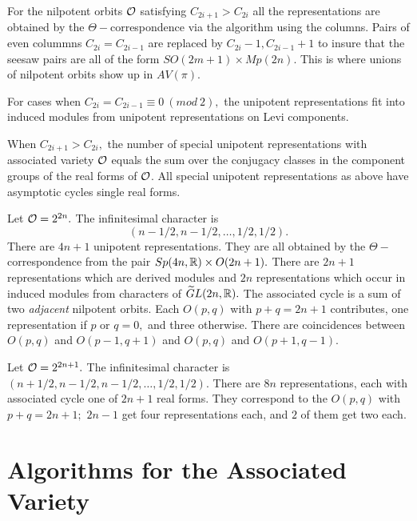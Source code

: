 \documentclass[11pt ,reqno]{amsart}
\begin{document}
\begin{theorem}\label{t:seesaw}
For the nilpotent orbits ${\mathcal O}$ satisfying $C_{2i+1}>C_{2i}$ all the
representations are obtained by the $\Theta-$correspondence via the
algorithm using the columns. Pairs of even colummns $C_{2i}=C_{2i-1}$
are replaced by  $C_{2i}-1,C_{2i-1}+1$ to insure that the seesaw pairs
are all of the form $SO(2m+1)\times Mp(2n).$ This is where unions of
nilpotent orbits show up in $AV(\pi)$.

For cases when $C_{2i}=C_{2i-1}\equiv 0\ (mod\ 2),$ the unipotent
representations fit into induced modules from unipotent
representations on Levi components.
\end{theorem}

\begin{proposition*} When $C_{2i+1}>C_{2i},$ the number of special unipotent representations with associated
variety ${\mathcal O}$ equals the sum over the conjugacy classes in the
component groups of the real forms of ${\mathcal O}$. All special unipotent
representations as above have asymptotic cycles single real forms. 
  
\end{proposition*}


\begin{example}
Let ${\mathcal O}=2^{2n}.$ The infinitesimal character is 
$$
(n-1/2,n-1/2,\dots ,1/2,1/2).
$$
There are $4n+1$ unipotent representations. They are all obtained by
the $\Theta-$correspondence from the pair $Sp(4n,{\mathbb R})\times O(2n+1).$
There are $2n+1$ representations which are derived modules and $2n$
representations which occur in induced modules from characters of
${\widetilde GL}(2n,{\mathbb R}).$ The associated cycle is a sum of two
  \textit{adjacent} nilpotent orbits. Each $O(p,q)$ with $p+q=2n+1$
  contributes, one representation if $p$ or $q=0,$ and three
  otherwise. There are coincidences between $O(p,q)$ and $O(p-1,q+1)$
  and $O(p,q)$ and $O(p+1,q-1).$ 
\end{example}
\begin{example}
 Let ${\mathcal O}=2^{2n+1}.$ The infinitesimal character is
 $(n+1/2,n-1/2,n-1/2,\dots ,1/2,1/2).$ There are $8n$ representations, each
 with associated cycle one of $2n+1$ real forms. They correspond to
 the $O(p,q)$ with $p+q=2n+1;$ $2n-1$ get four representations each,
 and $2$ of them get two each. 

\end{example}




\section{Algorithms for the Associated Variety}\label{3}
\end{document}
